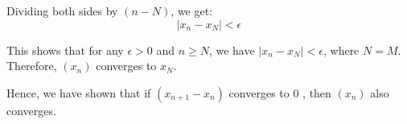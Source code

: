 \documentclass{report}
\begin{document}
Dividing both sides by $(n-N)$, we get:
$$
\left|x_n-x_N\right|<\epsilon
$$

This shows that for any $\epsilon>0$ and $n \geq N$, we have $\left|x_n-x_N\right|<\epsilon$, where $N=M$. Therefore, $\left(x_n\right)$ converges to $x_N$.

Hence, we have shown that if $\left(x_{n+1}-x_n\right)$ converges to 0 , then $\left(x_n\right)$ also converges.
\end{document}
